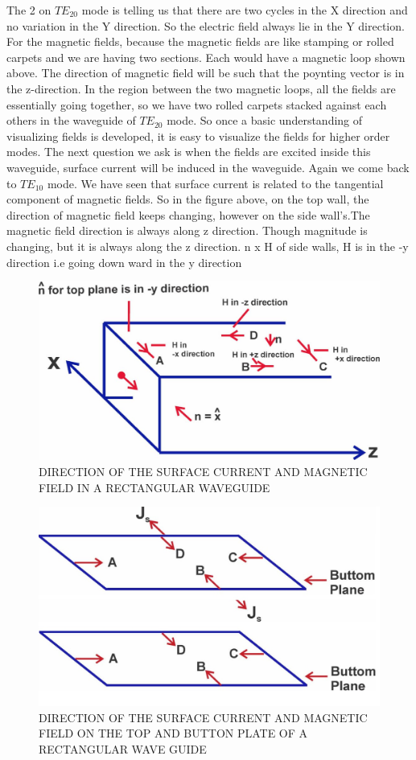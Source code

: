 The 2 on $TE_{20}$ mode is telling us that there are two cycles in the X direction and no variation in the Y direction. So the electric field always lie in the Y direction. For the magnetic fields, because the magnetic fields are like stamping or rolled carpets and we are having two sections. Each would have a magnetic loop shown above. The direction of magnetic field will be such that the poynting vector is in the z-direction. In the region between the two magnetic loops, all the fields are essentially going together, so we have two rolled carpets stacked against each others in the waveguide of $TE_{20}$ mode. So once a basic understanding of visualizing fields is developed, it is easy to visualize the fields for higher order modes. The next question we ask is when the fields are excited inside this waveguide, surface current will be induced in the waveguide. Again we come back to $TE_{10}$ mode. We have seen that surface current is related to the tangential component of magnetic fields. So in the figure above, on the top wall, the direction of magnetic field keeps changing, however on the side wall's.The magnetic field direction is always along z direction. Though magnitude is changing, but it is always along the z direction. n x H of side walls, H is in the -y direction i.e going down ward in the y direction
\begin{figure}[h]
\centering
\includegraphics[width=1\linewidth]{./graphics/lecture-image-5.jpg}
\caption{DIRECTION OF THE SURFACE CURRENT AND MAGNETIC FIELD IN A RECTANGULAR WAVEGUIDE}
\end{figure}
\begin{figure}[h]
\centering
\includegraphics[width=1\linewidth]{./graphics/lecture-image-6.jpg}
\caption{DIRECTION OF THE SURFACE CURRENT AND MAGNETIC FIELD ON THE TOP AND BUTTON PLATE OF A RECTANGULAR WAVE GUIDE}
\end{figure}

